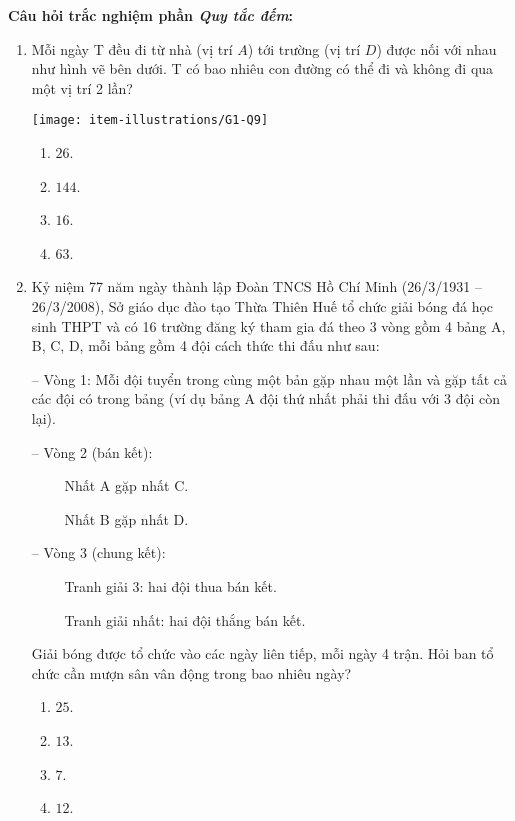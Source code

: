 \noindent\textbf{Câu hỏi trắc nghiệm phần \textit{Quy tắc đếm}:}
\begin{enumerate}[label=\textbf{Câu \arabic*.},align=left,left=0cm..0cm,itemindent=*]
	\item Mỗi ngày T đều đi từ nhà (vị trí $A$) tới trường (vị trí $D$) được nối với nhau như hình vẽ bên dưới. T có bao nhiêu con đường có thể đi và không đi qua một vị trí 2 lần?\par {\centering\texttt{[image: item-illustrations/G1-Q9]}\par}
	\begin{multicols}{4}\begin{enumerate}[label=\textbf{\Alph*.},align=left,left=1cm..0cm,itemindent=*]
		\item $26$. \item $144$. \item $16$. \item $63$.
	\end{enumerate}\end{multicols}
	\item Kỷ niệm 77 năm ngày thành lập Đoàn TNCS Hồ Chí Minh (26/3/1931 – 26/3/2008), Sở giáo dục đào tạo Thừa Thiên Huế tổ chức giải bóng đá học sinh THPT và có 16 trường đăng ký tham gia đá theo 3 vòng gồm 4 bảng A, B, C, D, mỗi bảng gồm 4 đội cách thức thi đấu như sau:\par
	– Vòng 1: Mỗi đội tuyển trong cùng một bản gặp nhau một lần và gặp tất cả các đội có trong bảng (ví dụ bảng A đội thứ nhất phải thi đấu với 3 đội còn lại).\par
	– Vòng 2 (bán kết):\par
	~~~~ Nhất A gặp nhất C.\par
	~~~~ Nhất B gặp nhất D.\par
	– Vòng 3 (chung kết):\par
	~~~~ Tranh giải 3: hai đội thua bán kết.\par
	~~~~ Tranh giải nhất: hai đội thắng bán kết.\par
	Giải bóng được tổ chức vào các ngày liên tiếp, mỗi ngày 4 trận. Hỏi ban tổ chức cần mượn sân vân động trong bao nhiêu ngày?
	\begin{multicols}{4}\begin{enumerate}[label=\textbf{\Alph*.},align=left,left=1cm..0cm,itemindent=*]
		\item $25$. \item $13$. \item $7$. \item $12$.
	\end{enumerate}\end{multicols}

\end{enumerate}
